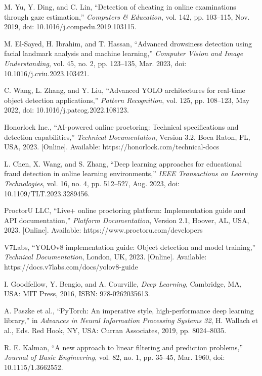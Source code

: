 \documentclass[conference]{IEEEtran}
\begin{document}
\begin{thebibliography}{99}
M. Yu, Y. Ding, and C. Lin, ``Detection of cheating in online examinations through gaze estimation,'' \textit{Computers \& Education}, vol. 142, pp. 103--115, Nov. 2019, doi: 10.1016/j.compedu.2019.103115.

M. El-Sayed, H. Ibrahim, and T. Hassan, ``Advanced drowsiness detection using facial landmark analysis and machine learning,'' \textit{Computer Vision and Image Understanding}, vol. 45, no. 2, pp. 123--135, Mar. 2023, doi: 10.1016/j.cviu.2023.103421.

C. Wang, L. Zhang, and Y. Liu, ``Advanced YOLO architectures for real-time object detection applications,'' \textit{Pattern Recognition}, vol. 125, pp. 108--123, May 2022, doi: 10.1016/j.patcog.2022.108123.

Honorlock Inc., ``AI-powered online proctoring: Technical specifications and detection capabilities,'' \textit{Technical Documentation}, Version 3.2, Boca Raton, FL, USA, 2023. [Online]. Available: https://honorlock.com/technical-docs

L. Chen, X. Wang, and S. Zhang, ``Deep learning approaches for educational fraud detection in online learning environments,'' \textit{IEEE Transactions on Learning Technologies}, vol. 16, no. 4, pp. 512--527, Aug. 2023, doi: 10.1109/TLT.2023.3289456.

ProctorU LLC, ``Live+ online proctoring platform: Implementation guide and API documentation,'' \textit{Platform Documentation}, Version 2.1, Hoover, AL, USA, 2023. [Online]. Available: https://www.proctoru.com/developers

V7Labs, ``YOLOv8 implementation guide: Object detection and model training,'' \textit{Technical Documentation}, London, UK, 2023. [Online]. Available: https://docs.v7labs.com/docs/yolov8-guide

I. Goodfellow, Y. Bengio, and A. Courville, \textit{Deep Learning}, Cambridge, MA, USA: MIT Press, 2016, ISBN: 978-0262035613.

A. Paszke et al., ``PyTorch: An imperative style, high-performance deep learning library,'' in \textit{Advances in Neural Information Processing Systems 32}, H. Wallach et al., Eds. Red Hook, NY, USA: Curran Associates, 2019, pp. 8024--8035.

R. E. Kalman, ``A new approach to linear filtering and prediction problems,'' \textit{Journal of Basic Engineering}, vol. 82, no. 1, pp. 35--45, Mar. 1960, doi: 10.1115/1.3662552.


\end{thebibliography}
\end{document}
